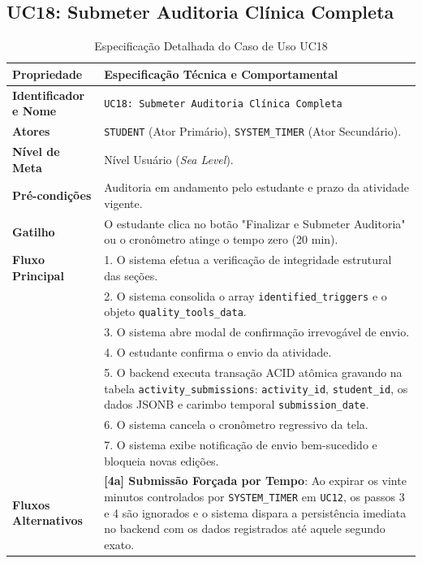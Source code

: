 \subsection{UC18: Submeter Auditoria Clínica Completa}
\label{uc18_especificacao}

\begin{table}[!ht]
\centering
\caption{Especificação Detalhada do Caso de Uso UC18}
\label{tab_uc18}
\footnotesize
\begin{tabularx}{\textwidth}{p{3.5cm} X}
\toprule
\textbf{Propriedade} & \textbf{Especificação Técnica e Comportamental} \\
\midrule
\textbf{Identificador e Nome} & \texttt{UC18: Submeter Auditoria Clínica Completa} \\
\textbf{Atores} & \texttt{STUDENT} (Ator Primário), \texttt{SYSTEM\_TIMER} (Ator Secundário). \\
\textbf{Nível de Meta} & Nível Usuário (\textit{Sea Level}). \\
\textbf{Pré-condições} & Auditoria em andamento pelo estudante e prazo da atividade vigente. \\
\textbf{Gatilho} & O estudante clica no botão "Finalizar e Submeter Auditoria" ou o cronômetro atinge o tempo zero (20 min). \\
\textbf{Fluxo Principal} & 
1. O sistema efetua a verificação de integridade estrutural das seções.\\
& 2. O sistema consolida o array \texttt{identified\_triggers} e o objeto \texttt{quality\_tools\_data}.\\
& 3. O sistema abre modal de confirmação irrevogável de envio.\\
& 4. O estudante confirma o envio da atividade.\\
& 5. O backend executa transação ACID atômica gravando na tabela \texttt{activity\_submissions}: \texttt{activity\_id}, \texttt{student\_id}, os dados JSONB e carimbo temporal \texttt{submission\_date}.\\
& 6. O sistema cancela o cronômetro regressivo da tela.\\
& 7. O sistema exibe notificação de envio bem-sucedido e bloqueia novas edições. \\
\textbf{Fluxos Alternativos} & 
\textbf{[4a] Submissão Forçada por Tempo}: Ao expirar os vinte minutos controlados por \texttt{SYSTEM\_TIMER} em \texttt{UC12}, os passos 3 e 4 são ignorados e o sistema dispara a persistência imediata no backend com os dados registrados até aquele segundo exato. \\

\end{tabularx}
\end{table}
